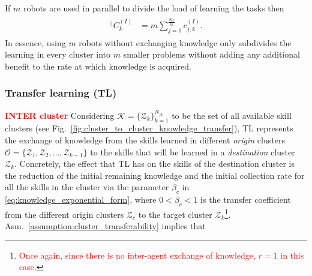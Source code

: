 If $m$ robots are used in parallel to divide the load of learning the tasks then
\begin{align}
	\begin{split}
		{}^{\lvert \rvert}C^{(I)}_k &= m\sum^{\frac{N_{\mathcal{Z}}}{m}}_{j=1} c^{(I)}_{j,k}.
	\end{split}
\end{align}
In essence, using $m$ robots without exchanging knowledge only subdivides the learning in every cluster into $m$ smaller problems without adding any additional benefit to the rate at which knowledge is acquired. 

\subsubsection{\textbf{Transfer learning (TL)}}
\textcolor{red}{\textbf{INTER cluster}}
Considering $\mathcal{K} = \{ \mathcal{Z}_k \}^{N_\mathcal{K}}_{k=1}$ to be the set of all available skill clusters (see Fig.~\ref{fig:cluster_to_cluster_knowledge_transfer}), TL represents the exchange of knowledge from the skills learned in different \emph{origin} clusters $\mathcal{O} = \{ \mathcal{Z}_1,\mathcal{Z}_2,\ldots,\mathcal{Z}_{k-1} \}$ to the skills that will be learned in a \emph{destination} cluster $\mathcal{Z}_k$. Concretely, the effect that TL has on the skills of the destination cluster is the reduction of the initial remaining knowledge and the initial collection rate for all the skills in the cluster via the parameter $\beta_c$ in \eqref{eq:knowledge_exponential_form}, 
where $0<\beta_{c} < 1$ is the transfer coefficient from the different origin clusters $\mathcal{Z}_{c}$ to the target cluster $\mathcal{Z}_{k}$\footnote{\textcolor{red}{Once again, since there is no inter-agent exchange of knowledge, $ r = 1 $ in this case.}}. Asm.~\ref{assumption:cluster_transferability} implies that
